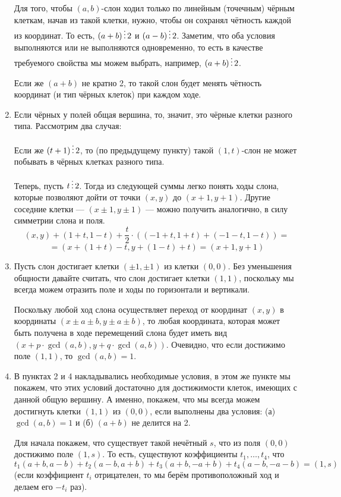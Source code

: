 \begin{enumerate}
Для того, чтобы $(a,b)$-слон ходил только по линейным (точечным)
чёрным клеткам, начав из такой клетки, нужно, чтобы он сохранял чётность 
каждой из координат.
То есть, $(a+b) \mathop{\vdots} 2$ и $(a-b) \mathop{\vdots} 2$. Заметим, что оба условия
выполняются или не выполняются одновременно, то есть в качестве требуемого
свойства мы можем выбрать, например, $(a+b) \mathop{\vdots} 2$.

Если же $(a+b)$ не кратно 2, то такой слон будет менять чётность координат
(и тип чёрных клеток) при каждом ходе.

\item Если чёрных у полей общая вершина, то, значит, это чёрные клетки разного
типа. Рассмотрим два случая:

Если же $(t+1) \mathop{\vdots} 2$, то (по предыдущему пункту) такой $(1,t)$-слон 
не может побывать в чёрных клетках разного типа. 

Теперь, пусть $t \mathop{\vdots} 2$. Тогда из следующей суммы легко понять ходы слона,
которые позволяют дойти от точки $(x,y)$ до $(x+1,y+1)$. Другие соседние клетки ---
$(x \pm 1, y \pm 1)$ --- можно получить аналогично, в силу симметрии слона и 
поля.
$$(x,y) + (1+t,1-t) + \frac{t}{2} \cdot ((-1+t,1+t) + (-1-t,1-t)) =$$
$$= (x+(1+t)-t, y+(1-t)+t) = (x+1,y+1)$$

\item Пусть слон достигает клетки $(\pm 1,\pm 1)$ из клетки $(0,0)$.
Без уменьшения общности давайте считать, что слон достигает клетки $(1,1)$, 
поскольку мы всегда можем отразить поле и ходы по горизонтали и вертикали.

Поскольку любой ход
слона осуществляет переход от координат $(x,y)$ в координаты 
$(x \pm a \pm b, y \pm a \pm b)$, то любая координата, которая может быть получена
в ходе перемещений слона будет иметь вид $(x + p\cdot\gcd(a,b), y + q\cdot\gcd(a,b))$.
Очевидно, что если достижимо поле $(1,1)$, то $\gcd(a,b) = 1$.

\item В пунктах 2 и 4 накладывались необходимые условия, в этом же пункте
мы покажем, что этих условий достаточно для достижимости клеток, имеющих с данной
общую вершину. А именно, покажем, что мы всегда можем достигнуть клетки 
$(1,1)$ из $(0,0)$, если выполнены два условия: (а) $\gcd(a,b)=1$ и (б) $(a+b)$ 
не делится на 2.

Для начала покажем, что существует такой нечётный $s$, что из поля $(0,0)$ 
достижимо поле $(1,s)$.
То есть, существуют коэффициенты $t_1, \ldots, t_4$, что 
$$t_1 (a+b,a-b) + t_2 (a-b,a+b) + t_3 (a+b,-a+b) + t_4 (a-b,-a-b) = (1,s)$$
(если коэффициент $t_i$ отрицателен, то мы берём противоположный ход и делаем
его $-t_i$ раз).


\end{enumerate}
